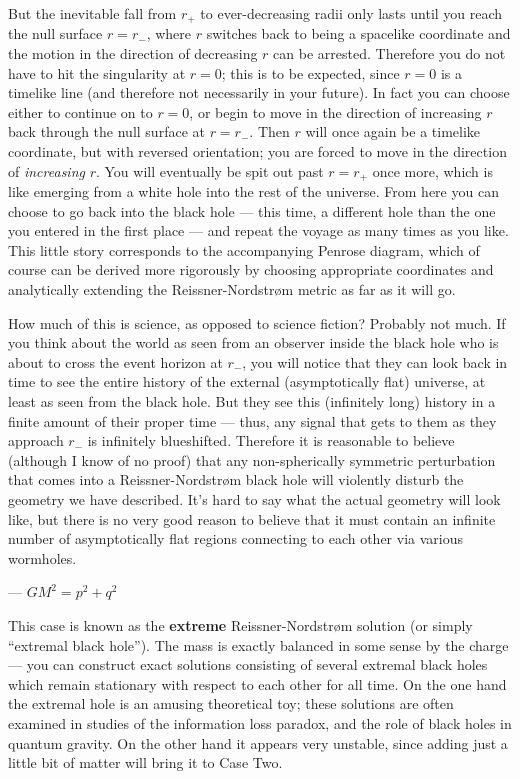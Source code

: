 \documentclass[12pt]{article}
\begin{document}
But the inevitable fall from $r_+$ to ever-decreasing radii only
lasts until you reach the null surface $r=r_-$, where $r$
switches back to being a spacelike coordinate and the motion in
the direction of decreasing $r$ can be arrested.  Therefore you
do not have to hit the singularity at $r=0$; this is to be expected,
since $r=0$ is a timelike line (and therefore not necessarily in your
future).  In fact you can choose either to continue on to $r=0$, or
begin to move in the direction of increasing $r$ back through the
null surface at $r=r_-$.  Then $r$ will once again be a timelike 
coordinate, but with reversed orientation; you are forced to move
in the direction of {\it increasing} $r$.  You will eventually be
spit out past $r=r_+$ once more, which is like emerging from a
white hole into the rest of the universe.  From here you can choose
to go back into the black hole --- this time, a different hole than
the one you entered in the first place --- and repeat the voyage
as many times as you like.  This little story corresponds to the
accompanying Penrose diagram, which of course can be derived more
rigorously by choosing appropriate coordinates and analytically
extending the Reissner-Nordstr{\o}m metric as far as it will go.

How much of this is science, as opposed to science fiction?
Probably not much.  If you think about the world as seen from
an observer inside the black hole who is about to cross the event
horizon at $r_-$, you will notice that they can look back in time
to see the entire history of the external (asymptotically flat)
universe, at least as seen from the black hole.  But they see this
(infinitely long) history in a finite amount of their proper time ---
thus, any  signal that gets to them as they approach $r_-$ is
infinitely blueshifted.  Therefore it is reasonable to believe
(although I know of no proof) that any non-spherically symmetric
perturbation that comes into a Reissner-Nordstr{\o}m black hole
will violently disturb the geometry we have described.  It's hard to 
say what the actual geometry will look like, but there is no very
good reason to believe that it must contain an infinite number of
asymptotically flat regions connecting to each other via
various wormholes.

 --- $GM^2=p^2+q^2$

This case is known as the {\bf extreme} Reissner-Nordstr{\o}m
solution (or simply ``extremal black hole'').  
The mass is exactly balanced in some sense by the charge ---
you can construct exact solutions consisting of several extremal
black holes which remain stationary with respect to each other
for all time.  On the one hand the extremal hole is an amusing theoretical 
toy; these solutions are often examined in studies of the information
loss paradox, and the role of black holes in quantum gravity.
On the other hand it appears very unstable, since adding just a
little bit of matter will bring it to Case Two.
\end{document}

